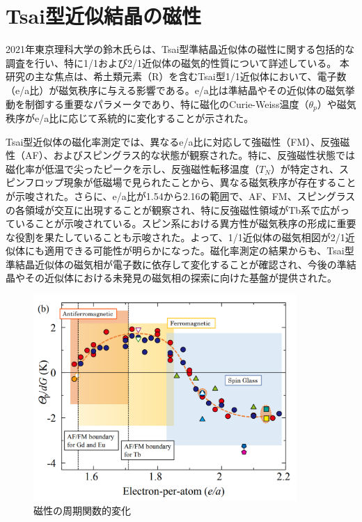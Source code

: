 \documentclass[11pt,a4j]{jreport}
\begin{document}
\section{Tsai型近似結晶の磁性}
2021年東京理科大学の鈴木氏らは、Tsai型準結晶近似体の磁性に関する包括的な調査を行い、特に1/1および2/1近似体の磁気的性質について詳述している。
本研究の主な焦点は、希土類元素（R）を含むTsai型1/1近似体において、電子数（e/a比）が磁気秩序に与える影響である。e/a比は準結晶やその近似体の磁気挙動を制御する重要なパラメータであり、特に磁化のCurie-Weiss温度（$\theta_p$）や磁気秩序がe/a比に応じて系統的に変化することが示された。\par
Tsai型近似体の磁化率測定では、異なるe/a比に対応して強磁性（FM）、反強磁性（AF）、およびスピングラス的な状態が観察された。特に、反強磁性状態では磁化率が低温で尖ったピークを示し、反強磁性転移温度（$T_N$）が特定され、スピンフロップ現象が低磁場で見られたことから、異なる磁気秩序が存在することが示唆された。さらに、e/a比が1.54から2.16の範囲で、AF、FM、スピングラスの各領域が交互に出現することが観察され、特に反強磁性領域がTb系で広がっていることが示唆されている。スピン系における異方性が磁気秩序の形成に重要な役割を果たしていることも示唆された。よって、1/1近似体の磁気相図が2/1近似体にも適用できる可能性が明らかになった。磁化率測定の結果からも、Tsai型準結晶近似体の磁気相が電子数に依存して変化することが確認され、今後の準結晶やその近似体における未発見の磁気相の探索に向けた基盤が提供された。
\begin{figure}[htbp]
  \centering
  \vspace{10mm}
  \includegraphics[width=100mm]{./figure/e_a.png}
  \caption{磁性の周期関数的変化}
  \label{e_a}
\end{figure}
\end{document}
